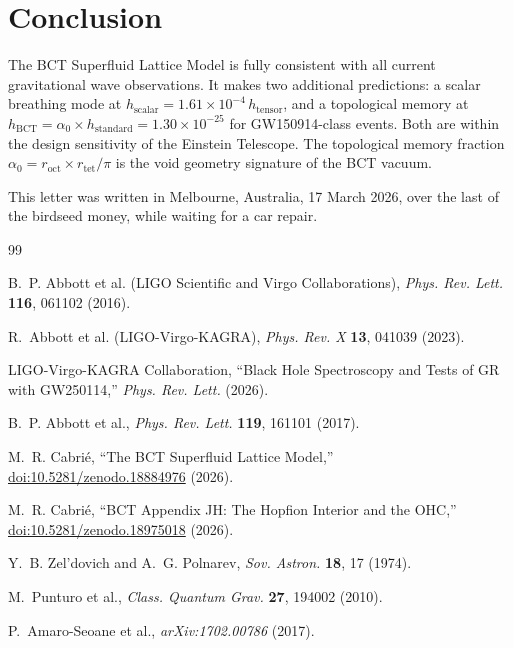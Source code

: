 \documentclass[aps,prl,twocolumn,superscriptaddress,showpacs]{revtex4-2}
\begin{document}
\section{Conclusion}

The BCT Superfluid Lattice Model is fully consistent with 
all current gravitational wave observations. It makes two 
additional predictions: a scalar breathing mode at 
$h_\mathrm{scalar} = 1.61\times10^{-4}\,h_\mathrm{tensor}$, 
and a topological memory at $h_\mathrm{BCT} = \alpha_0 \times 
h_\mathrm{standard} = 1.30\times10^{-25}$ for GW150914-class 
events. Both are within the design sensitivity of the 
Einstein Telescope. The topological memory fraction $\alpha_0 
= r_\mathrm{oct}\times r_\mathrm{tet}/\pi$ is the void geometry 
signature of the BCT vacuum.

\begin{acknowledgments}
This letter was written in Melbourne, Australia, 17 March 2026, 
over the last of the birdseed money, while waiting for a car repair.
\end{acknowledgments}

\begin{thebibliography}{99}

B.~P. Abbott et al. (LIGO Scientific and Virgo Collaborations),
\textit{Phys. Rev. Lett.} \textbf{116}, 061102 (2016).

R.~Abbott et al. (LIGO-Virgo-KAGRA),
\textit{Phys. Rev. X} \textbf{13}, 041039 (2023).

LIGO-Virgo-KAGRA Collaboration,
``Black Hole Spectroscopy and Tests of GR with GW250114,''
\textit{Phys. Rev. Lett.} (2026).

B.~P. Abbott et al.,
\textit{Phys. Rev. Lett.} \textbf{119}, 161101 (2017).

M.~R. Cabri\'{e},
``The BCT Superfluid Lattice Model,''
\href{https://doi.org/10.5281/zenodo.18884976}{doi:10.5281/zenodo.18884976} (2026).

M.~R. Cabri\'{e},
``BCT Appendix JH: The Hopfion Interior and the OHC,''
\href{https://doi.org/10.5281/zenodo.18975018}{doi:10.5281/zenodo.18975018} (2026).

Y.~B. Zel'dovich and A.~G. Polnarev,
\textit{Sov. Astron.} \textbf{18}, 17 (1974).

M.~Punturo et al.,
\textit{Class. Quantum Grav.} \textbf{27}, 194002 (2010).

P.~Amaro-Seoane et al.,
\textit{arXiv:1702.00786} (2017).

\end{thebibliography}
\end{document}
